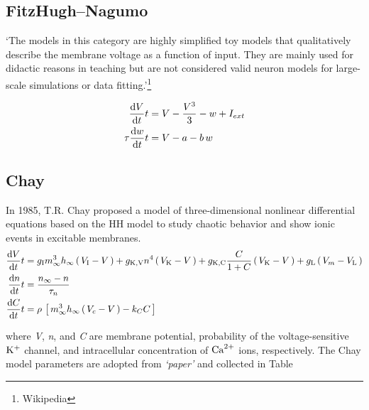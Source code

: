 \documentclass[../../Orator.tex]{subfiles}
\begin{document}
\subsection{FitzHugh–Nagumo}
`The models in this category are highly simplified toy models that qualitatively describe the membrane voltage as a function of input. They are mainly used for didactic reasons in teaching but are not considered valid neuron models for large-scale simulations or data fitting.'\footnote{Wikipedia}

\begin{subequations} \label{eq:FitNagSys}
    \begin{align}
        \ode{V}{t} &= V - \frac{V^3}{3} - w + I_{ext} \\ 
        \tau\ode{w}{t} &= V - a - b\,w 
    \end{align}
\end{subequations}


\subsection{Chay}

In 1985, T.R. Chay proposed a model of three-dimensional nonlinear differential equations based on the HH model to study chaotic behavior and show ionic events in excitable membranes. 
\begin{subequations} \label{eq:ChaySys}
    \begin{align}
        \ode{V}{t} &= g_\rmm{I}  m^3_\infty h_\infty \br{V_\rmm{I} - V} + g_\rmm{K, V} n^4 \br{V_\rmm{K} - V} + g_\rmm{K, C}  \frac{C}{1+C}\br{V_\rmm{K} - V} + g_\rmm{L} \br{V_m - V_\rmm{L}} \\ 
        \ode{n}{t} &= \frac{n_\infty - n}{\tau_n} \\
        \ode{C}{t} &= \rho \, \sbr{m^3_\infty h_\infty \br{V_c - V} - k_C C}
    \end{align}
\end{subequations}

where \textit{V}, \textit{n}, and \textit{C} are membrane potential, probability of the voltage-sensitive \(\mathrm{K}^+\) channel, and intracellular concentration of \(\mathrm{Ca}^{2+}\) ions, respectively. The Chay model parameters are adopted from \textit{`paper'} and collected in Table
\end{document}
